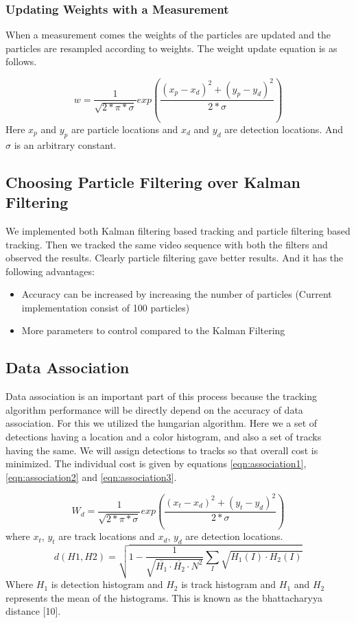 \documentclass[12pt,a4paper]{report}
\begin{document}
\subsubsection{Updating Weights with a Measurement}
When a measurement comes the weights of the particles are updated and the particles are resampled according to weights. The weight update equation is as follows.

\begin{equation}
w = \frac{1}{\sqrt{2*\pi* \sigma }}exp\left (\frac{(x_p-x_d)^2+ (y_p-y_d)^2}{2*\sigma }\right )
\end{equation}
Here $x_p$ and $y_p$ are particle locations and $x_d$ and $y_d$ are detection locations. And $\sigma$ is an arbitrary constant.

\subsection{Choosing Particle Filtering over Kalman Filtering}
We implemented both Kalman filtering based tracking and particle filtering based tracking. Then we tracked the same video sequence with both the filters and observed the results. Clearly particle filtering gave better results. And it has the following advantages:
\begin{itemize}
\item Accuracy can be increased by increasing the number of particles (Current implementation consist of 100 particles)
\item More parameters to control compared to the Kalman Filtering
\end{itemize}

\subsection{Data Association}
Data association is an important part of this process because the tracking algorithm performance will be directly depend on the accuracy of data association. For this we utilized the hungarian algorithm. Here we a set of detections having a location and a color histogram, and also a set of tracks having the same. We will assign detections to tracks so that overall cost is minimized. The individual cost is given by equations \ref{eqn:association1},  \ref{eqn:association2} and \ref{eqn:association3}.

\begin{equation}
\label{eqn:association1}
W_d = \frac{1}{\sqrt{2*\pi* \sigma }}exp\left (\frac{(x_t-x_d)^2+ (y_t-y_d)^2}{2*\sigma }\right )
\end{equation}
where $x_t$, $y_t$ are track locations and $x_d$, $y_d$ are detection locations.
\begin{equation}
\label{eqn:association2}
d(H1,H2)=\sqrt{1-\frac{1}{\sqrt{\overline{H_1}\cdot \overline{H_2}\cdot N^2}}\sum_{I}^{ }\sqrt{H_1(I)\cdot H_2(I)}}
\end{equation}
Where $H_1$ is detection histogram and $H_2$ is track histogram and $H_1$ and $H_2$  represents the mean of the histograms. This is known as the bhattacharyya distance [10].
\end{document}
